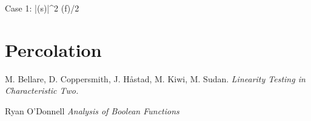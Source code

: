 Case 1: \sum |(s)|^2 \geq \var(f)/2

\chapter{Percolation}

\begin{thebibliography}{9}

M. Bellare, D. Coppersmith, J. H\r{a}stad, M. Kiwi, M. Sudan.
\textit{Linearity Testing in Characteristic Two.}

Ryan O'Donnell
\textit{Analysis of Boolean Functions}

\end{thebibliography}

